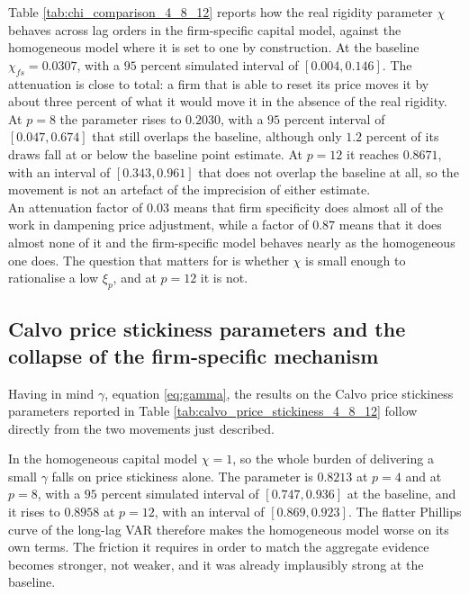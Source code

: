 \documentclass[12pt, a4paper]{article}
\begin{document}
Table \ref{tab:chi_comparison_4_8_12} reports how the real rigidity parameter $\chi$ behaves
across lag orders in the firm-specific capital model, against the homogeneous model where it is
set to one by construction. At the baseline $\chi_{fs} = 0.0307$, with a $95$ percent simulated
interval of $[0.004, 0.146]$. The attenuation is close to total: a firm that is able to reset
its price moves it by about three percent of what it would move it in the absence of the real
rigidity. At $p = 8$ the parameter rises to $0.2030$, with a $95$ percent interval of
$[0.047, 0.674]$ that still overlaps the baseline, although only $1.2$ percent of its draws fall at
or below the baseline point estimate. At $p = 12$ it reaches $0.8671$, with an interval of
$[0.343, 0.961]$ that does not overlap the baseline at all, so the movement is not an artefact of
the imprecision of either estimate.
\\

An attenuation factor of $0.03$ means that firm specificity does almost all of the work
in dampening price adjustment, while a factor of $0.87$ means that it does almost none of it and
the firm-specific model behaves nearly as the homogeneous one does. The question that matters
for \citet{ACEL2011} is whether $\chi$ is small enough to rationalise a low $\xi_p$, and at $p = 12$ it is not.

\subsection{Calvo price stickiness parameters and the collapse of the firm-specific mechanism}
\label{sec:results_calvo}

Having in mind $\gamma$, equation \eqref{eq:gamma}, the results on the Calvo price stickiness parameters
reported in Table \ref{tab:calvo_price_stickiness_4_8_12} follow directly from the two movements
just described.

    {}
    {\noindent{}}
\FloatBarrier

In the homogeneous capital model $\chi = 1$, so the whole burden of delivering a small $\gamma$
falls on price stickiness alone. The parameter is $0.8213$ at $p = 4$ and at $p = 8$, with a
$95$ percent simulated interval of $[0.747, 0.936]$ at the baseline, and it rises to $0.8958$ at
$p = 12$, with an interval of $[0.869, 0.923]$. The flatter Phillips curve of the long-lag VAR
therefore makes the homogeneous model worse on its own terms. The friction it requires in order
to match the aggregate evidence becomes stronger, not weaker, and it was already implausibly
strong at the baseline.
\\
\end{document}
